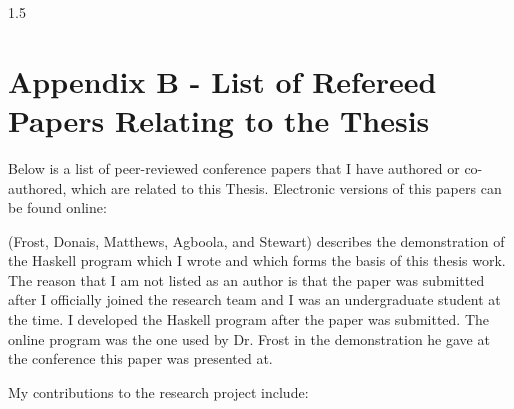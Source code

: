 \documentclass[fleqn, oneside, 12pt]{book}
\theoremstyle{definitionsty}
\newcommand{\uwinonehalfspacelen}{1.5}
\newcommand{\uwindefaultspacelen}{\uwinonehalfspacelen}
\newenvironment{uwindefaultspaceenv}%
{\begin{spacing}{\uwindefaultspacelen}}%
	{\end{spacing}}
\begin{document}
\begin{uwindefaultspaceenv}

\section*{Appendix B - List of Refereed Papers Relating to the Thesis}
\label{appendix:b}

Below is a list of peer-reviewed conference papers that I have authored or co-authored, which are related to this Thesis.  Electronic versions of this papers can be found online: %

\cite{donais2013system} 

\cite{peelar2017windsor} 

\cite{peelar2018toolpath} 

\cite{frost2018extensible} 

\cite{frostpeelar2019} 

\cite{peelar2020compositional} 

\cite{peelarfrostwebist2020} 

\cite{frost2014demonstration} 

\cite{frost2014demonstration} (Frost, Donais, Matthews, Agboola, and Stewart) describes the demonstration of the Haskell program which I wrote and which forms the basis of this thesis work.  The reason that I am not listed as an author is that the paper was submitted after I officially joined the research team and I was an undergraduate student at the time.  I developed the Haskell program after the paper was submitted.  The online program was the one used by Dr. Frost in the demonstration he gave at the conference this paper was presented at.

My contributions to the research project include:


\end{uwindefaultspaceenv}
\end{document}
